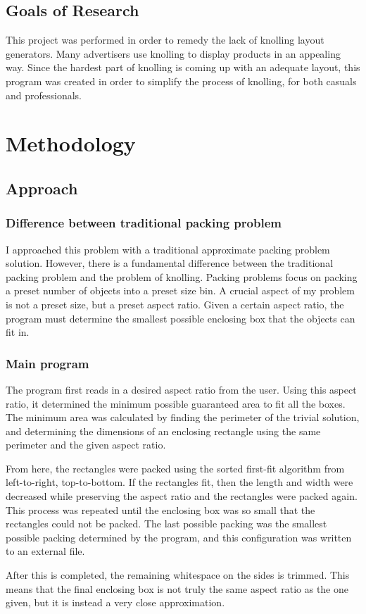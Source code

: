 \documentclass[10pt,titlepage,letterpaper]{article}
\begin{document}
	\subsection{Goals of Research}
	This project was performed in order to remedy the lack of knolling layout generators. Many advertisers use knolling to display products in an appealing way. Since the hardest part of knolling is coming up with an adequate layout, this program was created in order to simplify the process of knolling, for both casuals and professionals.

	\section{Methodology}
	\subsection{Approach}
	\subsubsection{Difference between traditional packing problem}
	I approached this problem with a traditional approximate packing problem solution. However, there is a fundamental difference between the traditional packing problem and the problem of knolling. Packing problems focus on packing a preset number of objects into a preset size bin. A crucial aspect of my problem is not a preset size, but a preset aspect ratio. Given a certain aspect ratio, the program must determine the smallest possible enclosing box that the objects can fit in.
	\subsubsection{Main program}
	The program first reads in a desired aspect ratio from the user. Using this aspect ratio, it determined the minimum possible guaranteed area to fit all the boxes. The minimum area was calculated by finding the perimeter of the trivial solution, and determining the dimensions of an enclosing rectangle using the same perimeter and the given aspect ratio.\par
	From here, the rectangles were packed using the sorted first-fit algorithm from left-to-right, top-to-bottom\cite{first-fit}. If the rectangles fit, then the length and width were decreased while preserving the aspect ratio and the rectangles were packed again. This process was repeated until the enclosing box was so small that the rectangles could not be packed. The last possible packing was the smallest possible packing determined by the program, and this configuration was written to an external file.\par
	After this is completed, the remaining whitespace on the sides is trimmed. This means that the final enclosing box is not truly the same aspect ratio as the one given, but it is instead a very close approximation. 
\end{document}
